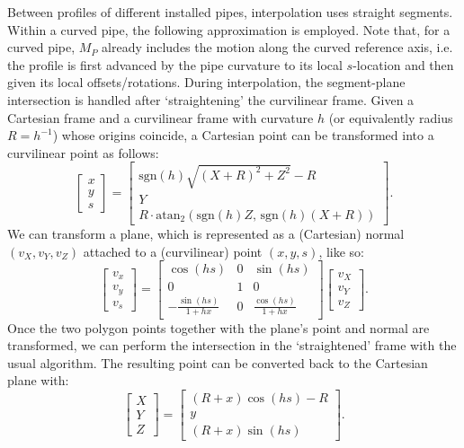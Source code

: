 Between profiles of different installed pipes, interpolation uses straight segments.
Within a curved pipe, the following approximation is employed.
Note that, for a curved pipe, $M_P$ already includes the motion along the curved reference axis, i.e. the profile is first advanced by the pipe curvature to its local $s$-location and then given its local offsets/rotations.
During interpolation, the segment-plane intersection is handled after `straightening' the curvilinear frame.
Given a Cartesian frame and a curvilinear frame with curvature $h$ (or equivalently radius $R = h^{-1}$) whose origins coincide, a Cartesian point can be transformed into a curvilinear point as follows:
\[
	\begin{bmatrix} x \\ y \\ s \end{bmatrix} =
	\begin{bmatrix}
		\mathrm{sgn}(h) \sqrt{(X+R)^2+Z^2}-R \\
		Y \\
		R \cdot \mathrm{atan}_2\left(\mathrm{sgn}(h) Z,\, \mathrm{sgn}(h)(X + R)\right)
	\end{bmatrix}.
\]
We can transform a plane, which is represented as a (Cartesian) normal $(v_X, v_Y, v_Z)$ attached to a (curvilinear) point $(x, y, s)$, like so:
\[
	\begin{bmatrix} v_x \\ v_y \\ v_s \end{bmatrix} =
	\begin{bmatrix}
		\cos(hs) & 0 & \sin(hs) \\
		0 & 1 & 0 \\
		-\frac{\sin(hs)}{1+h x} & 0 & \frac{\cos(hs)}{1+h x}
	\end{bmatrix}
	\begin{bmatrix} v_X \\ v_Y \\ v_Z \end{bmatrix}.
\]
Once the two polygon points together with the plane's point and normal are transformed, we can perform the intersection in the `straightened' frame with the usual algorithm.
The resulting point can be converted back to the Cartesian plane with:
\[
	\begin{bmatrix} X \\ Y \\ Z \end{bmatrix} =
	\begin{bmatrix}
        (R + x) \cos(h s) - R \\
        y \\
        (R + x) \sin(h s)
    \end{bmatrix}.
\]

